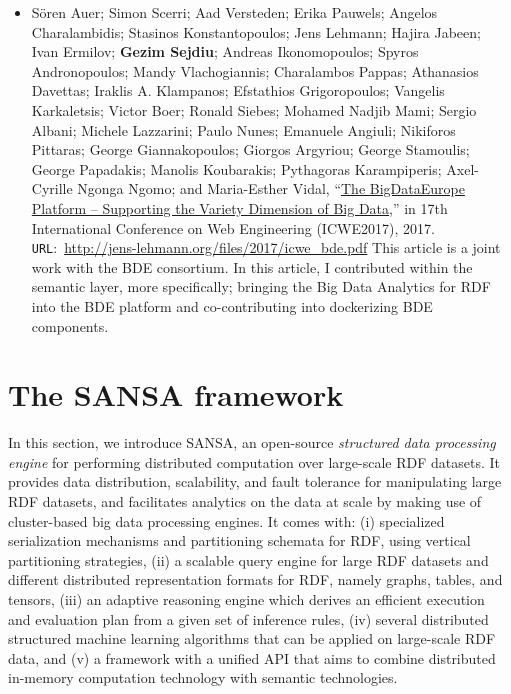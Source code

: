 \begin{itemize}
    \item Sören Auer; Simon Scerri; Aad Versteden; Erika Pauwels; Angelos Charalambidis; Stasinos Konstantopoulos; Jens Lehmann; Hajira Jabeen; Ivan Ermilov; \textbf{Gezim Sejdiu}; Andreas Ikonomopoulos; Spyros Andronopoulos; Mandy Vlachogiannis; Charalambos Pappas; Athanasios Davettas; Iraklis A. Klampanos; Efstathios Grigoropoulos; Vangelis Karkaletsis; Victor Boer; Ronald Siebes; Mohamed Nadjib Mami; Sergio Albani; Michele Lazzarini; Paulo Nunes; Emanuele Angiuli; Nikiforos Pittaras; George Giannakopoulos; Giorgos Argyriou; George Stamoulis; George Papadakis; Manolis Koubarakis; Pythagoras Karampiperis; Axel-Cyrille Ngonga Ngomo; and Maria-Esther Vidal, “\href{http://jens-lehmann.org/files/2017/icwe_bde.pdf}{The BigDataEurope Platform – Supporting the Variety Dimension of Big Data},” in 17th International Conference on Web Engineering (ICWE2017), 2017. \texttt{URL}:~\url{http://jens-lehmann.org/files/2017/icwe_bde.pdf}
    This article is a joint work with the BDE consortium. 
    In this article, I contributed within the semantic layer, more specifically; bringing the Big Data Analytics for \gls{RDF} into the BDE platform and co-contributing into dockerizing BDE components.
    
\end{itemize}

\section{The SANSA framework}
\label{sec:the-sansa-framework}
In this section, we introduce SANSA, an open-source \emph{structured data processing engine} for performing distributed computation over large-scale \gls{RDF} datasets.
It provides data distribution, scalability, and fault tolerance for manipulating large \gls{RDF} datasets, and facilitates analytics on the data at scale by making use of cluster-based big data processing engines.
It comes with: (i) specialized serialization mechanisms and partitioning schemata for \gls{RDF}, using vertical partitioning strategies,
(ii) a scalable query engine for large \gls{RDF} datasets and different distributed representation formats for \gls{RDF}, namely graphs, tables, and tensors,
(iii) an adaptive reasoning engine which derives an efficient execution and evaluation plan from a given set of inference rules,
(iv) several distributed structured machine learning algorithms that can be applied on large-scale RDF data,
and (v) a framework with a unified API that aims to combine distributed in-memory computation technology with semantic technologies.

